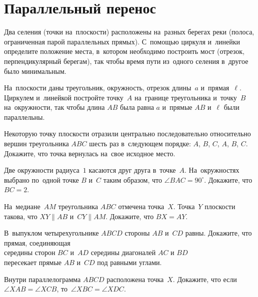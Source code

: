 
\section*{Параллельный перенос}


\begin{problems}

\item
Два селения (точки на~плоскости) расположены на~разных берегах реки
(полоса, ограниченная парой параллельных прямых).
С~помощью циркуля и~линейки определите положение места, в~котором необходимо
построить мост (отрезок, перпендикулярный берегам), так чтобы время пути
из~одного селения в~другое было минимальным.

\item
На~плоскости даны треугольник, окружность, отрезок длины~$a$ и~прямая~$\ell$.
Циркулем и~линейкой постройте точку~$A$ на~границе треугольника и~точку~$B$
на~окружности, так чтобы длина $AB$ была равна $a$ и~прямые $AB$ и~$\ell$ были
параллельны.

\item
Некоторую точку плоскости отразили центрально последовательно относительно
вершин треугольника $ABC$ шесть раз в~следующем порядке:
$A$, $B$, $C$, $A$, $B$, $C$.
Докажите, что точка вернулась на~свое исходное место.

\item
Две окружности радиуса~$1$ касаются друг друга в~точке~$A$.
На~окружностях выбрано по~одной точке $B$ и~$C$ таким образом, что
$\angle BAC = 90^{\circ}$.
Докажите, что $BC = 2$.

\item
На~медиане~$AM$ треугольника $ABC$ отмечена точка~$X$.
Точка~$Y$ плоскости такова, что $XY \parallel AB$ и~$CY \parallel AM$.
Докажите, что $BX = AY$.

\item
В~выпуклом четырехугольнике $ABCD$ стороны $AB$ и~$CD$ равны.
Докажите, что прямая, соединяющая
\\
\subproblem середины сторон $BC$ и~$AD$
\qquad
\subproblem середины диагоналей $AC$ и $BD$
\\
пересекает прямые $AB$ и~$CD$ под равными углами.

\item
Внутри параллелограмма $ABCD$ расположена точка~$X$.
Докажите, что если $\angle XAB = \angle XCB$, то~$\angle XBC = \angle XDC$.


\end{problems}
